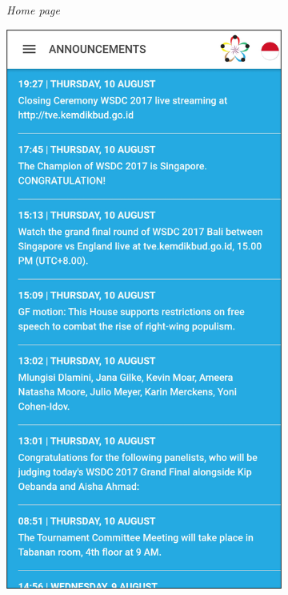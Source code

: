 \begin{figure}[H]
\begin{subfigure}[b]{0.247\textwidth}
	    \caption{{\it \textit{Home page}}}
	    \label{fig:wsdcapp}
     \end{subfigure}
     \hfill
     \begin{subfigure}[b]{0.24\textwidth}
    \centering
	    \includegraphics[scale=0.37]{Gambar/AnnouncementsPage.png}

\end{subfigure}
\end{figure}

